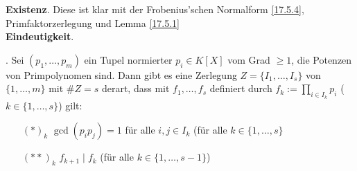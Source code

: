 \documentclass[../../main.tex]{subfiles}
\begin{document}
\begin{cproof}
\textbf{Existenz}. Diese ist klar mit der Frobenius'schen Normalform \ref{17.5.4}, Primfaktorzerlegung und Lemma \ref{17.5.1}\\

\noindent\textbf{Eindeutigkeit}.
    \begin{behbox}
        \hbeh{}. 
            Sei $(p_1,\ldots ,p_m)$ ein Tupel normierter $p_i\in K[X]$ vom Grad $\ge 1$, die Potenzen von Primpolynomen sind. Dann gibt es eine Zerlegung $Z=\{I_1,\ldots ,I_s\}$ von $\{1,\ldots ,m\}$ mit $\#Z=s$ derart, dass mit $f_1,\ldots ,f_s$ definiert durch $f_k:=\prod_{i\in I_k}p_i$ ($k\in\{1,\ldots ,s\}$) gilt:
        \begin{itemize}
            \item[$(*)_k$] $\gcd(p_ip_j)=1$ für alle $i,j\in I_k$ (für alle $k\in\{1,\ldots ,s\}$
            \item[$(**)_k$] $f_{k+1}\mid f_k$ (für alle $k\in\{1,\ldots ,s-1\}$)
        \end{itemize}


\end{behbox}
\end{cproof}
\end{document}

